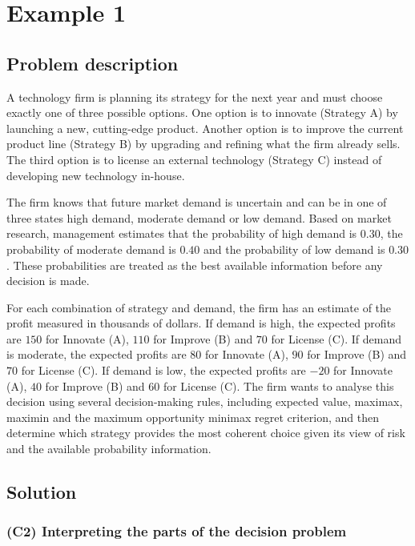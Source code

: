 \documentclass[11pt]{article}
\begin{document}
	
	\section{Example 1}\label{example-1}
	
	\subsection{Problem description}\label{example-1-problem}
	
	A technology firm is planning its strategy for the next year and must choose exactly one of three possible options.
	One option is to innovate (Strategy A) by launching a new, cutting-edge product. Another option is to improve the current product line
	(Strategy B) by upgrading and refining what the firm already sells. The third option is to license an external technology (Strategy C)
	instead of developing new technology in-house.
	
	The firm knows that future market demand is uncertain and can be in one of three states high demand, moderate demand or low demand.
	Based on market research, management estimates that the probability of high demand is \(0.30\), the probability of moderate demand is \(0.40\)
	and the probability of low demand is \(0.30\). These probabilities are treated as the best available information before any decision is made.
	
	For each combination of strategy and demand, the firm has an estimate of the profit measured in thousands of dollars.
	If demand is high, the expected profits are \(150\) for Innovate (A), \(110\) for Improve (B) and \(70\) for License (C).
	If demand is moderate, the expected profits are \(80\) for Innovate (A), \(90\) for Improve (B) and \(70\) for License (C).
	If demand is low, the expected profits are \(-20\) for Innovate (A), \(40\) for Improve (B) and \(60\) for License (C).
	The firm wants to analyse this decision using several decision-making rules, including expected value, maximax, maximin
	and the maximum opportunity minimax regret criterion, and then determine which strategy provides the most coherent choice
	given its view of risk and the available probability information.
	
	\subsection{Solution}
	
	\subsubsection{(C2) Interpreting the parts of the decision problem}\label{example-1-c2}
	
\end{document}
